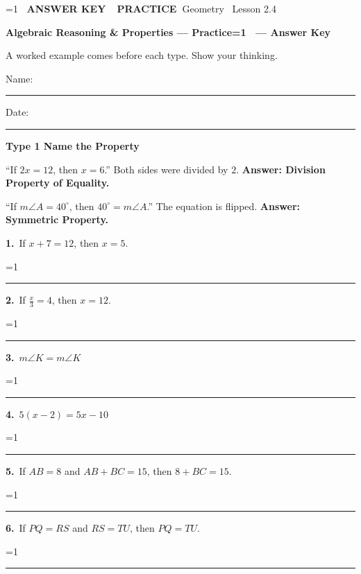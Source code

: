 \documentclass[11pt,letterpaper]{article}
\newcommand{\badge}[1]{\colorbox{fmtitle}{\color{white}\bfseries\small\ #1\ }}
\newcommand{\topicbar}[1]{\needspace{4.5cm}\par\vspace{5mm}
  \begin{tcolorbox}[enhanced,colback=fmtitle,colframe=fmtitle,arc=2mm,left=4mm,top=1.5mm,bottom=1.5mm]
  \color{white}\bfseries\large #1
  \end{tcolorbox}}
\providecommand{\iskey}{0}
\newcommand{\pans}[2][3.2cm]{\ifnum\iskey=1 \underline{\makebox[#1][c]{\color{fmmistake}\bfseries #2}}\else\rule{#1}{0.4pt}\fi}
\newcommand{\sdp}[3]{\begin{minipage}[t][2.4cm]{0.48\linewidth}{\color{fmturn}\bfseries #1.}\ #2\par\vfill\hfill \pans[3.6cm]{#3}\end{minipage}}
\newlength{\pw}
\renewcommand{\pans}[2][3.2cm]{\ifnum\iskey=1 \settowidth{\pw}{\bfseries #2}\ifdim\pw>#1 \parbox[b]{#1}{\raggedleft\color{fmmistake}\bfseries\small #2}\else\underline{\makebox[#1][c]{\color{fmmistake}\bfseries #2}}\fi\else\rule{#1}{0.4pt}\fi}
\begin{document}
\ifnum\iskey=1 \colorbox{fmwatch}{\color{white}\bfseries\small\ ANSWER KEY\ }\else\badge{PRACTICE}\fi\hfill{\small\color{fmgray}Geometry \textperiodcentered\ Lesson 2.4}\par\vspace{4mm}
{\color{fmtitle}\LARGE\bfseries Algebraic Reasoning \& Properties --- Practice\ifnum\iskey=1 \ --- Answer Key\fi}\par\vspace{1mm}
{\color{fmgray}A worked example comes before each type. Show your thinking.}\par\vspace{3mm}
Name: \rule{6cm}{0.4pt}\hspace{1cm}Date: \rule{3.5cm}{0.4pt}\par\vspace{2mm}

\needspace{6cm}\topicbar{Type 1 \quad Name the Property}
\begin{watchme}``If $2x = 12$, then $x = 6$.'' \quad Both sides were divided by $2$. \quad \textbf{Answer: Division Property of Equality.}\par
``If $m\angle A = 40^\circ$, then $40^\circ = m\angle A$.'' \quad The equation is flipped. \quad \textbf{Answer: Symmetric Property.}\end{watchme}
\needspace{3.4cm}\noindent\sdp{1}{If $x + 7 = 12$, then $x = 5$.}{Subtraction Prop.\ of Equality}\hfill\sdp{2}{If $\tfrac{x}{3} = 4$, then $x = 12$.}{Multiplication Prop.\ of Equality}\par\vspace{2mm}
\needspace{3.4cm}\noindent\sdp{3}{$m\angle K = m\angle K$}{Reflexive Property}\hfill\sdp{4}{$5(x - 2) = 5x - 10$}{Distributive Property}\par\vspace{2mm}
\needspace{3.4cm}\noindent\sdp{5}{If $AB = 8$ and $AB + BC = 15$, then $8 + BC = 15$.}{Substitution Property}\hfill\sdp{6}{If $PQ = RS$ and $RS = TU$, then $PQ = TU$.}{Transitive Property}\par
\end{document}
